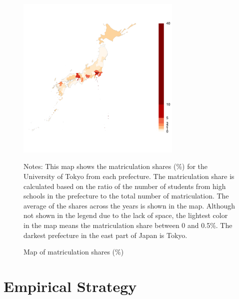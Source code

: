 \documentclass[12pt,letterpaper]{article}
\begin{document}
\begin{figure}[H]
  \centering
  \caption{Map of matriculation shares (\%)}
  \includegraphics[width = 0.7\textwidth]{../Output/images/admission_map.pdf}
  \label{fig:admission_map}
  \footnotesize
  \begin{tablenotes}
    \item Notes:
      This map shows the matriculation shares (\%) for the University of Tokyo from each prefecture.
      The matriculation share is calculated based on the ratio of the number of students from high schools in the prefecture to the total number of matriculation.
      The average of the shares across the years is shown in the map.
      Although not shown in the legend due to the lack of space, the lightest color in the map means the matriculation share between 0 and 0.5\%.
      The darkest prefecture in the east part of Japan is Tokyo.
  \end{tablenotes}
\end{figure}

\section{Empirical Strategy}\label{sec:empirical_strategy}
\end{document}
